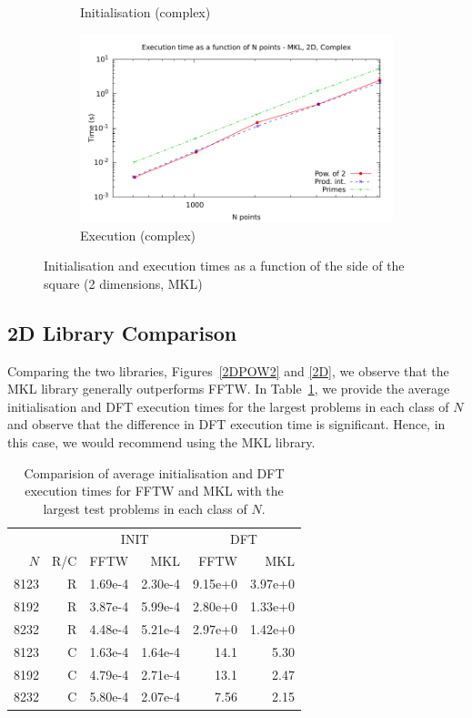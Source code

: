 \documentclass[12pt, a4paper]{article} \setlength{\textheight}{24cm}
\begin{document}
\begin{figure}[H]
\begin{subfigure}{.5\textwidth}
    \caption{Initialisation (complex)}
    \label{2DMKLCI}
  \end{subfigure}%
  \begin{subfigure}{.5\textwidth}
    \centering
    \includegraphics[width=.9\linewidth]{graphs/2d-mkl-exec-c.pdf}
    \caption{Execution (complex)}
    \label{2DMKLC}
  \end{subfigure}
  \caption{Initialisation and execution times as a function of the
    side of the square (2 dimensions, MKL)}
  \label{2DMKL}
\end{figure}






\subsection{2D Library Comparison}
Comparing the two libraries, Figures~\ref{2DPOW2} and \ref{2D}, we
observe that the MKL library generally outperforms FFTW. In
Table~\ref{Tbl:2D}, we provide the average initialisation and DFT
execution times for the largest problems in each class of $N$ and
observe that the difference in DFT execution time is
significant. Hence, in this case, we would recommend using the MKL
library.


\begin{table}[H]
  \centering
  \begin{tabular}{|rr|rr|rr|}
    \hline
    \multicolumn{2}{|c|}{ }& \multicolumn{2}{|c|}{INIT } & \multicolumn{2}{|c|}{DFT }  \\
     $N$ & R/C & FFTW & MKL & FFTW & MKL \\
    \hline
    \hline
    8123 & R & 1.69e-4 & 2.30e-4 & 9.15e+0 & 3.97e+0 \\
    8192 & R & 3.87e-4 & 5.99e-4 &  2.80e+0 & 1.33e+0  \\ 
    8232 & R & 4.48e-4 & 5.21e-4 & 2.97e+0 & 1.42e+0 \\  
\hline
    8123 & C & 1.63e-4 & 1.64e-4 & 14.1 & 5.30 \\
    8192 & C & 4.79e-4 & 2.71e-4 & 13.1 & 2.47 \\
    8232 & C & 5.80e-4 & 2.07e-4 & 7.56 & 2.15 \\
\hline
  \end{tabular}
  \caption{Comparision of average initialisation and DFT execution times for FFTW and MKL with the largest test problems in each class of $N.$}\label{Tbl:2D}
\end{table}
\end{document}
